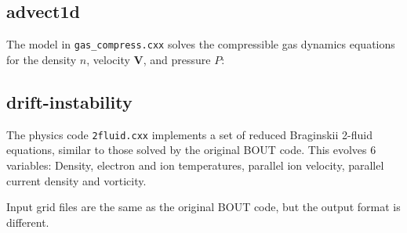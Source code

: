 \documentclass[12pt]{article}
\begin{document}
\subsection{advect1d}

The model in \texttt{gas\_compress.cxx} solves the compressible gas dynamics equations for
the density $n$, velocity $\mathbf{V}$, and pressure $P$:

\subsection{drift-instability}

The physics code \texttt{2fluid.cxx} implements a set of reduced Braginskii 2-fluid equations,
similar to those solved by the original BOUT code.
This evolves 6 variables: Density, electron and ion temperatures, parallel ion velocity,
parallel current density and vorticity.

Input grid files are the same as the original BOUT code, but the output format is different.
\end{document}
